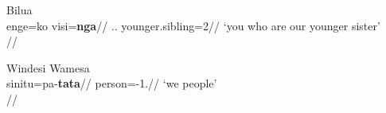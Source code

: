 \documentclass[A4paper]{article}
\begin{document}
\ex Bilua\label{ex:biluabpc}\\
\begingl
\gla enge=ko visi=\textbf{nga}//
\Pl.\Sg.\F{} younger.sibling=2\Sg//
\glft `you who are our younger sister'\\
\citep[103, (7.116)]{obata2003}//
\endgl
\xe

\ex Windesi Wamesa\label{ex:windesibpc}\\
\begingl
\gla sinitu=pa-\textbf{tata}//
\glb person=\Det{}-1\Pl{}.\Incl{}//
\glft `we people' \\{\citep[144, (3.46)]{gasser2014}}//
\endgl
\xe

\end{document}
